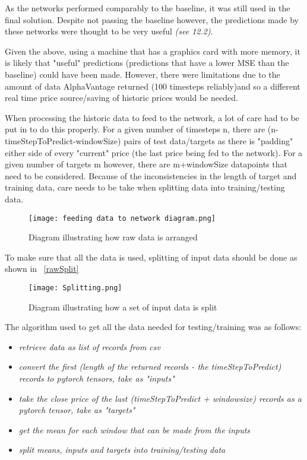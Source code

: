         As the networks performed comparably to the baseline, it was still used in the final solution. Despite not passing the baseline however, the predictions made by these networks were thought to be very useful \textit{(see 12.2)}.

        Given the above, using a machine that has a graphics card with more memory, it is likely that "useful" predictions (predictions that have a lower MSE than the baseline) could have been made. However, there were limitations due to the amount of data AlphaVantage returned (100 timesteps reliably)and so a different real time price source/saving of historic prices would be needed.

        When processing the historic data to feed to the network, a lot of care had to be put in to do this properly. For a given number of timesteps n, there are (n-timeStepToPredict-windowSize) pairs of test data/targets as there is "padding" either side of every "current" price (the last price being fed to the network). For a given number of targets m however, there are m+windowSize datapoints that need to be considered. Because of the inconsistencies in the length of target and training data, care needs to be take when splitting data into training/testing data.

        \begin{figure}[htbp]
            \centering
            \texttt{[image: feeding data to network diagram.png]}
            \caption{Diagram illustrating how raw data is arranged}
            \label{fig:rawArranged}
        \end{figure}

        To make sure that all the data is used, splitting of input data should be done as shown in ~\ref{rawSplit}

        \begin{figure}[htbp]
            \centering
            \texttt{[image: Splitting.png]}
            \caption{Diagram illustrating how a set of input data is split}
            \label{fig:rawSplit}
        \end{figure}

        \vspace{3mm}\linebreak
        The algorithm used to get all the data needed for testing/training was as follows: 
        \begin{itemize}
            \item \textit{retrieve data as list of records from csv}
            \item \textit{convert the first (length of the returned records - the timeStepToPredict) records to pytorch tensors, take as "inputs"}
            \item \textit{take the close price of the last (timeStepToPredict + windowsize) records as a pytorch tensor, take as "targets"}
            \item \textit{get the mean for each window that can be made from the inputs}
            \item \textit{split means, inputs and targets into training/testing data}
        \end{itemize}


